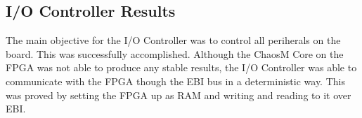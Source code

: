 \subsection{I/O Controller Results}

The main objective for the I/O Controller was to control all periherals on the board.
This was successfully accomplished. Although the ChaosM Core on the FPGA was not able
to produce any stable results, the I/O Controller was able to communicate with the
FPGA though the EBI bus in a deterministic way. This was proved by setting the
FPGA up as RAM and writing and reading to it over EBI.

